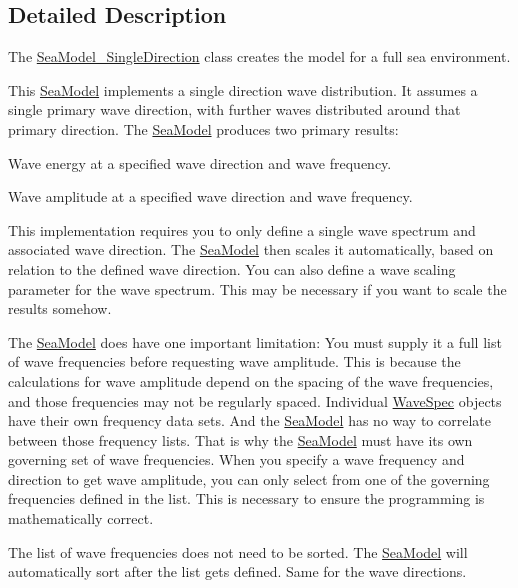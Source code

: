 \subsection{Detailed Description}
The \hyperlink{classosea_1_1_sea_model___single_direction}{Sea\-Model\-\_\-\-Single\-Direction} class creates the model for a full sea environment. 

This \hyperlink{classosea_1_1_sea_model}{Sea\-Model} implements a single direction wave distribution. It assumes a single primary wave direction, with further waves distributed around that primary direction. The \hyperlink{classosea_1_1_sea_model}{Sea\-Model} produces two primary results\-:
\begin{DoxyEnumerate}
\item Wave energy at a specified wave direction and wave frequency.
\item Wave amplitude at a specified wave direction and wave frequency.
\end{DoxyEnumerate}

This implementation requires you to only define a single wave spectrum and associated wave direction. The \hyperlink{classosea_1_1_sea_model}{Sea\-Model} then scales it automatically, based on relation to the defined wave direction. You can also define a wave scaling parameter for the wave spectrum. This may be necessary if you want to scale the results somehow.

The \hyperlink{classosea_1_1_sea_model}{Sea\-Model} does have one important limitation\-: You must supply it a full list of wave frequencies before requesting wave amplitude. This is because the calculations for wave amplitude depend on the spacing of the wave frequencies, and those frequencies may not be regularly spaced. Individual \hyperlink{classosea_1_1_wave_spec}{Wave\-Spec} objects have their own frequency data sets. And the \hyperlink{classosea_1_1_sea_model}{Sea\-Model} has no way to correlate between those frequency lists. That is why the \hyperlink{classosea_1_1_sea_model}{Sea\-Model} must have its own governing set of wave frequencies. When you specify a wave frequency and direction to get wave amplitude, you can only select from one of the governing frequencies defined in the list. This is necessary to ensure the programming is mathematically correct.

The list of wave frequencies does not need to be sorted. The \hyperlink{classosea_1_1_sea_model}{Sea\-Model} will automatically sort after the list gets defined. Same for the wave directions. 

